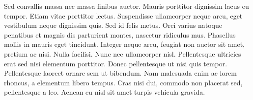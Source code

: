 Sed convallis massa nec massa finibus auctor. Mauris porttitor dignissim lacus eu tempor. Etiam vitae porttitor lectus. Suspendisse ullamcorper neque arcu, eget vestibulum neque dignissim quis. Sed id felis metus. Orci varius natoque penatibus et magnis dis parturient montes, nascetur ridiculus mus. Phasellus mollis in mauris eget tincidunt. Integer neque arcu, feugiat non auctor sit amet, pretium ac nisi. Nulla facilisi. Nunc nec ullamcorper nisl. Pellentesque ultricies erat sed nisi elementum porttitor. Donec pellentesque ut nisi quis tempor. Pellentesque laoreet ornare sem ut bibendum. Nam malesuada enim ac lorem rhoncus, a elementum libero tempus. Cras nisi dui, commodo non placerat sed, pellentesque a leo. Aenean eu nisl sit amet turpis vehicula gravida.